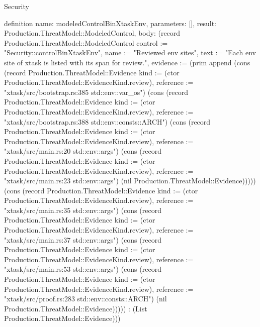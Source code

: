 \begin{lexlean}{Security}
\begin{semanticmodule}
definition{
  name: modeledControlBinXtaskEnv,
  parameters: [],
  result: Production.ThreatModel::ModeledControl,
  body: (record Production.ThreatModel::ModeledControl {control := "Security::controlBinXtaskEnv", name := "Reviewed env sites", text := "Each env site of xtask is listed with its span for review.", evidence := (prim append (cons (record Production.ThreatModel::Evidence {kind := (ctor Production.ThreatModel::EvidenceKind.review), reference := "xtask/src/bootstrap.rs:385 std::env::var_os"}) (cons (record Production.ThreatModel::Evidence {kind := (ctor Production.ThreatModel::EvidenceKind.review), reference := "xtask/src/bootstrap.rs:388 std::env::consts::ARCH"}) (cons (record Production.ThreatModel::Evidence {kind := (ctor Production.ThreatModel::EvidenceKind.review), reference := "xtask/src/main.rs:20 std::env::args"}) (cons (record Production.ThreatModel::Evidence {kind := (ctor Production.ThreatModel::EvidenceKind.review), reference := "xtask/src/main.rs:23 std::env::args"}) (nil Production.ThreatModel::Evidence))))) (cons (record Production.ThreatModel::Evidence {kind := (ctor Production.ThreatModel::EvidenceKind.review), reference := "xtask/src/main.rs:35 std::env::args"}) (cons (record Production.ThreatModel::Evidence {kind := (ctor Production.ThreatModel::EvidenceKind.review), reference := "xtask/src/main.rs:37 std::env::args"}) (cons (record Production.ThreatModel::Evidence {kind := (ctor Production.ThreatModel::EvidenceKind.review), reference := "xtask/src/main.rs:53 std::env::args"}) (cons (record Production.ThreatModel::Evidence {kind := (ctor Production.ThreatModel::EvidenceKind.review), reference := "xtask/src/proof.rs:283 std::env::consts::ARCH"}) (nil Production.ThreatModel::Evidence))))) : (List Production.ThreatModel::Evidence))})
}


\end{semanticmodule}
\end{lexlean}
